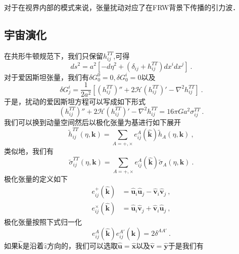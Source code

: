 
\begin{issues}
\issueNeedCite
\issueMissDepend
\end{issues}

对于在视界内部的模式来说，张量扰动对应了在FRW背景下传播的引力波．

\subsection{宇宙演化}
在共形牛顿规范下，我们只保留$h_{ij}^{TT}$,可得
\begin{equation}
ds^2 = a^2[-d  \eta^2+(\delta_{ij}+h_{ij}^{TT})dx^i dx^j ]~.
\end{equation}
对于爱因斯坦张量，我们有$\delta G^0_0 = 0, \delta G^i_0 = 0$以及
\begin{equation}
\delta G^i_j = \frac{1}{2 a^2} [ (h_{ij}^{TT}  )'' + 2\mathcal H (h_{ij}^{TT})' - \nabla^2 h_{ij}^{TT}  ]~.
\end{equation}
于是，扰动的爱因斯坦方程可以写成如下形式
\begin{equation}\label{TenPT_eq1}
(h_{ij}^{TT})'' + 2 \mathcal H (h_{ij}^{TT})' - \nabla^2 h_{ij}^{TT} = 16 \pi G a^2 \sigma_{ij}^{TT} ~.
\end{equation}
我们可以换到动量空间然后以极化张量为基进行如下展开
\begin{equation}
\tilde h_{ij}^{TT} (\eta,\mathbf k) = \sum_{A = +,\times} e^A_{ij} (\hat{\mathbf k}) \tilde h_A (\eta,\mathbf k)~, 
\end{equation}
类似地，我们有
\begin{equation}
\tilde \sigma_{ij}^{TT} (\eta,\mathbf k) = \sum_{A = +,\times} e^A_{ij} (\hat{\mathbf k}) \tilde \sigma_A (\eta,\mathbf k) ~.
\end{equation}
极化张量的定义如下
\begin{equation}
\begin{aligned}
e^+_{ij}(\hat{\mathbf k}) & = \hat{\mathbf u}_i \hat{\mathbf u}_j - \hat{\mathbf v}_i \hat{\mathbf v}_j ~, \\
e^\times_{ij} (\hat{\mathbf k}) & = \hat{\mathbf u}_i 
\hat{\mathbf v}_j + \hat{\mathbf v}_i \hat{\mathbf u}_j~,
\end{aligned}
\end{equation}
极化张量按照下式归一化
\begin{equation}
e^A_{ij} (\hat{\mathbf k}) e^{A'}_{ij} (\hat{\mathbf k}) = 2 \delta^{AA'} ~.
\end{equation}
如果$\hat{\mathbf k}$是沿着$\hat z$方向的，我们可以选取$\hat{\mathbf u} = \hat{\mathbf x}$以及$\hat{\mathbf v} = \hat{\mathbf y}$于是我们有
